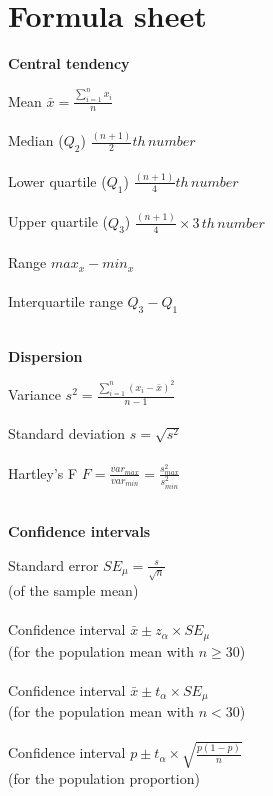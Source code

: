 \section{Formula sheet}
\label{formulasheet}

\begin{minipage}[t]{.45\textwidth}
\begin{center}
    \textbf{Central tendency}
\end{center}
\hline
\answerskip
Mean \hfill $\bar{x} = \frac{\sum^n_{i = 1} x_i}{n}$ \\
\\
Median ($Q_2$) \hfill $\frac{(n + 1)}{2}th \, number$ \\
\\
Lower quartile ($Q_1$) \hfill $\frac{(n + 1)}{4}th \, number$ \\
\\
Upper quartile ($Q_3$) \hfill $\frac{(n + 1)}{4} \times 3\, th \, number$ \\
\\
Range \hfill $max_x - min_x$ \\
\\
Interquartile range \hfill $Q_3 - Q_1$ \\
\\
\begin{center}
    \textbf{Dispersion}
\end{center}
\hline
\answerskip
Variance \hfill $s^2 = \frac{\sum^n_{i = 1} (x_i - \bar{x})^2}{n - 1}$ \\
\\
Standard deviation \hfill $s = \sqrt{s^2}$ \\
\\
Hartley's F \hfill $F = \frac{var_{max}}{var_{min}} = \frac{s^2_{max}}{s^2_{min}}$\\
\\
\begin{center}
    \textbf{Confidence intervals}
\end{center}
\hline
\answerskip
Standard error \hfill $SE_\mu = \frac{s}{\sqrt{n}}$ \\
{\scriptsize (of the sample mean)}\\
\\
Confidence interval \hfill $\bar{x} \pm z_\alpha \times SE_\mu$ \\
{\scriptsize (for the population mean with $n \geq 30$)}\\
\\
Confidence interval \hfill $\bar{x} \pm t_\alpha \times SE_\mu$ \\
{\scriptsize (for the population mean with $n < 30$)}\\
\\
Confidence interval \hfill $p \pm t_\alpha \times \sqrt{\frac{p(1 - p)}{n}}$ \\
{\scriptsize (for the population proportion)}\\
\end{minipage}
